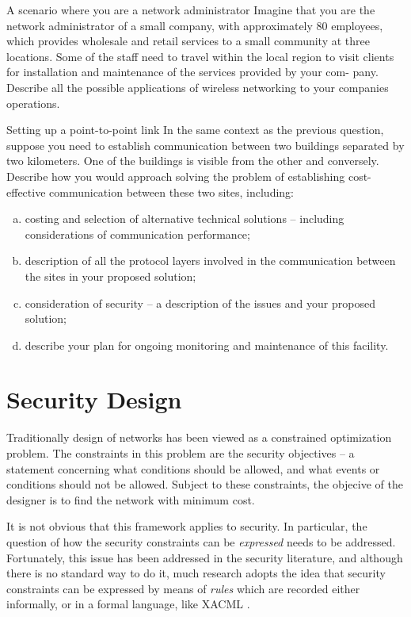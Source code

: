 \begin{exercise}{A scenario where you are a network administrator}
Imagine that you are the network administrator of a small company, with
approximately 80 employees, which provides wholesale and retail services to a small
community at three locations. Some of the staff need to travel within the local region
to visit clients for installation and maintenance of the services provided by your com-
pany. Describe all the possible applications of wireless networking to your companies
operations.
\end{exercise}

\begin{exercise}{Setting up a point-to-point link}
In the same context as the previous question, suppose you need to establish 
communication between two buildings separated by two kilometers. One of the
buildings is visible from the other and conversely. Describe how you would approach
solving the problem of establishing cost-effective communication between these two
sites, including:
\begin{enumerate}[(a)]
\item costing and selection of alternative technical solutions – including considerations
of communication performance;
\item description of all the protocol layers involved in the communication between the
sites in your proposed solution;
\item consideration of security – a description of the issues and your proposed solution;
\item describe your plan for ongoing monitoring and maintenance of this facility.
\end{enumerate}
\end{exercise}

\section{Security Design}

Traditionally design of networks has been viewed as a constrained optimization problem.
The constraints in this problem are the security objectives -- a statement concerning
what conditions should be allowed, and what events or conditions should not be allowed.
Subject to these constraints, the objecive of the designer is to find the network
with minimum cost.

It is not obvious that this framework applies to security. In particular, the question of
how the security constraints can be {\em expressed} needs to be addressed. Fortunately,
this issue has been addressed in the security literature, and although there is no 
standard way to do it, much research adopts the idea that security constraints can
be expressed by means of {\em rules} which are recorded either informally, or in a formal
language, like XACML \cite{xacml10}.

